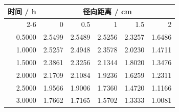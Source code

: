 \begin{tabular}{rrrrrr}
\toprule
时间 / h & \multicolumn{5}{c}{径向距离 / cm} \\
\cmidrule(lr){2-6}
 & 0 & 0.5 & 1 & 1.5 & 2 \\
\midrule
0.5000 & 2.5499 & 2.5489 & 2.5256 & 2.3257 & 1.6486 \\
1.0000 & 2.5257 & 2.4948 & 2.3578 & 2.0230 & 1.4711 \\
1.5000 & 2.3861 & 2.3256 & 2.1344 & 1.8020 & 1.3476 \\
2.0000 & 2.1709 & 2.1084 & 1.9236 & 1.6259 & 1.2311 \\
2.5000 & 1.9566 & 1.9006 & 1.7360 & 1.4720 & 1.1166 \\
3.0000 & 1.7662 & 1.7165 & 1.5702 & 1.3333 & 1.0081 \\
\bottomrule
\end{tabular}

